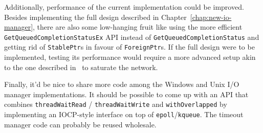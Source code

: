 \documentclass[a4paper,11pt,oneside]{report}
\begin{document}
Additionally, performance of the current implementation could be
improved. Besides implementing the full design described in
Chapter~\ref{chap:new-io-manager}, there are also some low-hanging fruit like
using the more efficient \texttt{GetQueuedCompletionStatusEx} API instead of
\texttt{GetQueuedCompletionStatus} and getting rid of \texttt{StablePtr}s in
favour of \texttt{ForeignPtr}s. If the full design were to be implemented,
testing its performance would require a more advanced setup akin to the one
described in~\cite{bib:voellmy} to saturate the network.

Finally, it'd be nice to share more code among the Windows and Unix I/O manager
implementations.  It should be possible to come up with an API that combines
\texttt{threadWaitRead} / \texttt{threadWaitWrite} and \texttt{withOverlapped}
by implementing an IOCP-style interface on top of
\texttt{epoll}/\texttt{kqueue}. The timeout manager code can probably be reused
wholesale.
\end{document}
